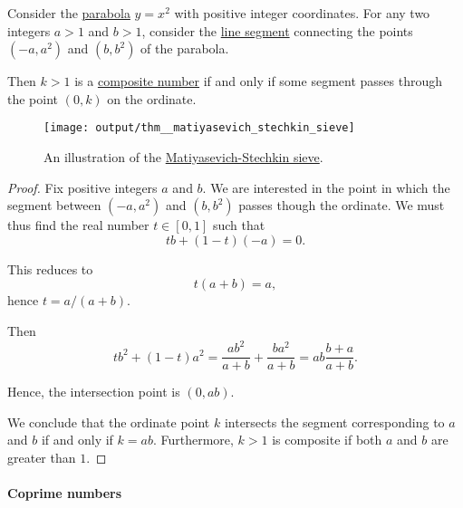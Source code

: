 \begin{theorem}\label{thm:matiyasevich_stechkin_sieve}
  Consider the \hyperref[def:parabola]{parabola} \( y = x^2 \) with positive integer coordinates. For any two integers \( a > 1 \) and \( b > 1 \), consider the \hyperref[def:line_segment]{line segment} connecting the points \( (-a, a^2) \) and \( (b, b^2) \) of the parabola.

  Then \( k > 1 \) is a \hyperref[def:prime_number]{composite number} if and only if some segment passes through the point \( (0, k) \) on the ordinate.

  \begin{figure}[!ht]
    \centering
    \texttt{[image: output/thm\_\_matiyasevich\_stechkin\_sieve]}
    \caption{An illustration of the \hyperref[thm:matiyasevich_stechkin_sieve]{Matiyasevich-Stechkin sieve}.}\label{fig:thm:matiyasevich_stechkin_sieve}
  \end{figure}
\end{theorem}
\begin{proof}
  Fix positive integers \( a \) and \( b \). We are interested in the point in which the segment between \( (-a, a^2) \) and \( (b, b^2) \) passes though the ordinate. We must thus find the real number \( t \in [0, 1] \) such that
  \begin{equation*}
    tb + (1 - t)(-a) = 0.
  \end{equation*}

  This reduces to
  \begin{equation*}
    t(a + b) = a,
  \end{equation*}
  hence \( t = a / (a + b) \).

  Then
  \begin{equation*}
    tb^2 + (1 - t)a^2
    =
    \frac {ab^2} {a + b} + \frac {ba^2} {a + b}
    =
    ab \frac {b + a} {a + b}.
  \end{equation*}

  Hence, the intersection point is \( (0, ab) \).

  We conclude that the ordinate point \( k \) intersects the segment corresponding to \( a \) and \( b \) if and only if \( k = ab \). Furthermore, \( k > 1 \) is composite if both \( a \) and \( b \) are greater than \( 1 \).
\end{proof}

\paragraph{Coprime numbers}

